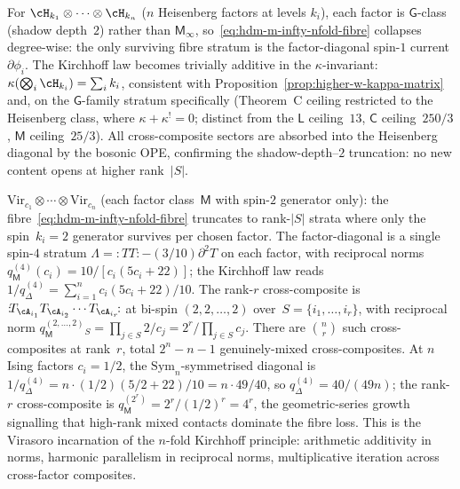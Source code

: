 \begin{example}
\label{ex:hdm-m-infty-nfold-heisenberg}
For $\cH_{k_1}\otimes\cdots\otimes\cH_{k_n}$ ($n$ Heisenberg factors
at levels $k_i$), each factor is $\mathsf G$-class (shadow depth~$2$)
rather than $\mathsf M_\infty$,
so~\eqref{eq:hdm-m-infty-nfold-fibre} collapses degree-wise: the
only surviving fibre stratum is the factor-diagonal spin-$1$
current $\partial\phi_i$. The Kirchhoff law becomes trivially
additive in the $\kappa$-invariant: $\kappa(\bigotimes_i\cH_{k_i})
=\sum_i k_i$, consistent with
Proposition~\ref{prop:higher-w-kappa-matrix} and, on the
$\mathsf G$-family stratum specifically (Theorem~C ceiling
restricted to the Heisenberg class, where
$\kappa+\kappa^!=0$; distinct from the $\mathsf L$ ceiling~$13$,
$\mathsf C$ ceiling~$250/3$, $\mathsf M$ ceiling~$25/3$). All cross-composite
sectors are absorbed into the Heisenberg diagonal by the bosonic
OPE, confirming the shadow-depth--$2$ truncation: no new content
opens at higher rank~$|S|$.
\end{example}

\begin{example}
\label{ex:hdm-m-infty-nfold-virasoro}
$\mathrm{Vir}_{c_1}\otimes\cdots\otimes\mathrm{Vir}_{c_n}$ (each
factor class~$\mathsf M$ with spin-$2$ generator only): the
fibre~\eqref{eq:hdm-m-infty-nfold-fibre} truncates to rank-$|S|$
strata where only the spin~$k_i=2$ generator survives per chosen
factor. The factor-diagonal is a single spin-$4$ stratum
$\Lambda = {:}\!TT\!{:} - (3/10)\partial^2 T$ on each factor, with
reciprocal norms $q_\mathsf M^{(4)}(c_i)=10/[c_i(5c_i+22)]$; the
Kirchhoff law reads
$1/q_\Delta^{(4)}=\sum_{i=1}^n c_i(5c_i+22)/10$. The rank-$r$
cross-composite is ${:}\!T_{\cA_{i_1}}T_{\cA_{i_2}}\cdots
T_{\cA_{i_r}}\!{:}$ at bi-spin $(2,2,\ldots,2)$ over~$S=\{i_1,\ldots,
i_r\}$, with reciprocal norm $q_\mathsf M^{(2,\ldots,2)}_S
=\prod_{j\in S}2/c_j = 2^r/\prod_{j\in S}c_j$. There are
$\binom{n}{r}$ such cross-composites at rank~$r$, total $2^n-n-1$
genuinely-mixed cross-composites. At $n$ Ising factors
$c_i=1/2$, the $\mathrm{Sym}_n$-symmetrised diagonal is
$1/q_\Delta^{(4)}=n\cdot(1/2)(5/2+22)/10=n\cdot 49/40$, so
$q_\Delta^{(4)}=40/(49n)$; the rank-$r$ cross-composite is
$q_\mathsf M^{(2^r)}=2^r/(1/2)^r=4^r$, the geometric-series growth
signalling that high-rank mixed contacts dominate the fibre loss.
This is the Virasoro incarnation of the $n$-fold Kirchhoff
principle: arithmetic additivity in norms, harmonic parallelism in
reciprocal norms, multiplicative iteration across cross-factor
composites.
\end{example}

